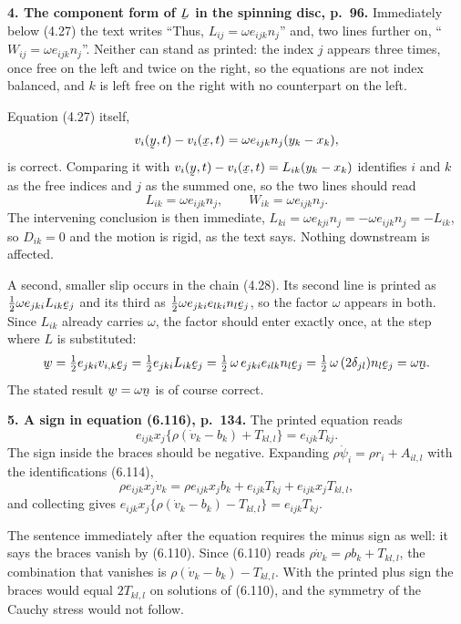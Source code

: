 \documentclass[12pt,a4paper]{article}
\DeclareRobustCommand{\vek}[1]{\underaccent{\tilde}{#1}}
\newcommand{\bx}{\vek{x}}
\newcommand{\bn}{\vek{n}}
\newcommand{\be}{\vek{e}}
\newcommand{\by}{\vek{y}}
\newcommand{\bL}{\vek{L}}
\newcommand{\bw}{\vek{w}}
\newenvironment{query}[1]%
  {\par\medskip\noindent\textbf{#1}\quad}{\par\medskip}
\begin{document}
\begin{query}{4. The component form of $\bL$ in the spinning disc, p.~96.}
Immediately below (4.27) the text writes ``Thus,
$L_{ij}=\omega e_{ijk}n_{j}$'' and, two lines further on,
``$W_{ij}=\omega e_{ijk}n_{j}$''. Neither can stand as printed: the index
$j$ appears three times, once free on the left and twice on the right, so
the equations are not index balanced, and $k$ is left free on the right
with no counterpart on the left.

Equation (4.27) itself,
\[
   v_{i}(\by,t)-v_{i}(\bx,t)=\omega e_{ijk}n_{j}(y_{k}-x_{k}),
\]
is correct. Comparing it with $v_{i}(\by,t)-v_{i}(\bx,t)
=L_{ik}(y_{k}-x_{k})$ identifies $i$ and $k$ as the free indices and $j$
as the summed one, so the two lines should read
\[
   L_{ik}=\omega e_{ijk}n_{j},
   \qquad
   W_{ik}=\omega e_{ijk}n_{j}.
\]
The intervening conclusion is then immediate,
$L_{ki}=\omega e_{kji}n_{j}=-\omega e_{ijk}n_{j}=-L_{ik}$, so $D_{ik}=0$
and the motion is rigid, as the text says. Nothing downstream is affected.

A second, smaller slip occurs in the chain (4.28). Its second line is
printed as $\tfrac12\omega e_{jki}L_{ik}\be_{j}$ and its third as
$\tfrac12\omega e_{jki}e_{lki}n_{l}\be_{j}$, so the factor $\omega$
appears in both. Since $L_{ik}$ already carries $\omega$, the factor
should enter exactly once, at the step where $L$ is substituted:
\[
   \bw=\tfrac12 e_{jki}v_{i,k}\be_{j}=\tfrac12 e_{jki}L_{ik}\be_{j}
   =\tfrac12\,\omega\,e_{jki}e_{ilk}n_{l}\be_{j}
   =\tfrac12\,\omega\,(2\delta_{jl})n_{l}\be_{j}=\omega\bn .
\]
The stated result $\bw=\omega\bn$ is of course correct.
\end{query}

\begin{query}{5. A sign in equation (6.116), p.~134.}
The printed equation reads
\[
   e_{ijk}x_{j}\big\{\rho(\dot v_{k}-b_{k})+T_{kl,l}\big\}=e_{ijk}T_{kj}.
\]
The sign inside the braces should be negative. Expanding
$\rho\dot\psi_{i}=\rho r_{i}+A_{il,l}$ with the identifications (6.114),
\[
   \rho e_{ijk}x_{j}\dot v_{k}
   =\rho e_{ijk}x_{j}b_{k}+e_{ijk}T_{kj}+e_{ijk}x_{j}T_{kl,l},
\]
and collecting gives $e_{ijk}x_{j}\{\rho(\dot v_{k}-b_{k})-T_{kl,l}\}
=e_{ijk}T_{kj}$.

The sentence immediately after the equation requires the minus sign as
well: it says the braces vanish by (6.110). Since (6.110) reads
$\rho\dot v_{k}=\rho b_{k}+T_{kl,l}$, the combination that vanishes is
$\rho(\dot v_{k}-b_{k})-T_{kl,l}$. With the printed plus sign the braces
would equal $2T_{kl,l}$ on solutions of (6.110), and the symmetry of the
Cauchy stress would not follow.
\end{query}
\end{document}
